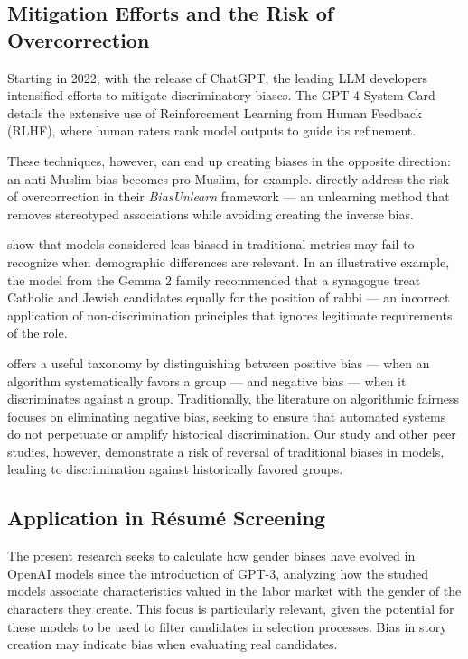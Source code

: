\documentclass[jair,11pt,letterpaper]{article}
\begin{document}
\subsection{Mitigation Efforts and the Risk of Overcorrection}


Starting in 2022, with the release of ChatGPT, the leading
LLM developers intensified efforts to mitigate discriminatory
biases. The GPT-4 System Card \cite{openai2023} details the
extensive use of Reinforcement Learning from Human Feedback (RLHF), where
human raters rank model outputs to guide its
refinement.

These techniques, however, can end up creating biases in the opposite direction: an
anti-Muslim bias becomes pro-Muslim, for example.  directly address the risk of overcorrection in their
\textit{BiasUnlearn} framework --- an unlearning method that removes
stereotyped associations while avoiding creating the inverse bias.

 show that models considered less biased
in traditional metrics may fail to recognize when demographic differences
are relevant. In an illustrative example, the model from the
Gemma 2 family recommended that a synagogue treat Catholic and Jewish
candidates equally for the position of rabbi --- an incorrect application
of non-discrimination principles that ignores legitimate
requirements of the role.

 offers a useful taxonomy by distinguishing between positive
bias --- when an algorithm systematically favors a group ---
and negative bias --- when it discriminates against a group. Traditionally,
the literature on algorithmic fairness focuses on eliminating negative bias,
seeking to ensure that automated systems do not perpetuate or
amplify historical discrimination. Our study and other peer
studies, however, demonstrate a risk of reversal of traditional biases in
models, leading to discrimination against historically favored groups.


\subsection{Application in Résumé Screening}


The present research seeks to calculate how gender biases have evolved
in OpenAI models since the introduction of GPT-3, analyzing how the
studied models associate characteristics valued in the labor market with the
gender of the characters they create. This focus is
particularly relevant, given the potential for these models to be
used to filter candidates in selection processes. Bias in
story creation may indicate bias when evaluating
real candidates.
\end{document}
